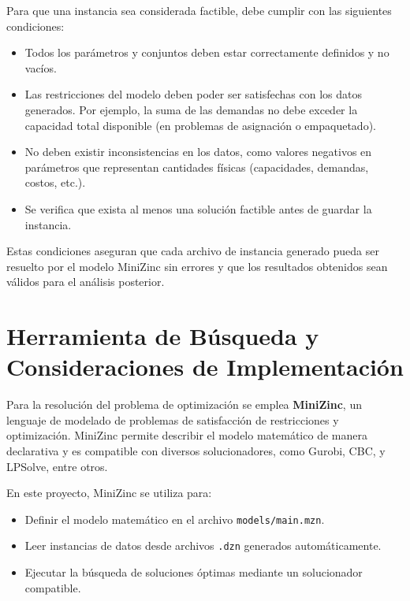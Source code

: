 \documentclass[a4paper,12pt]{article}
\begin{document}
Para que una instancia sea considerada factible, debe cumplir con las siguientes condiciones:
\begin{itemize}
    \item Todos los parámetros y conjuntos deben estar correctamente definidos y no vacíos.
    \item Las restricciones del modelo deben poder ser satisfechas con los datos generados. Por ejemplo, la suma de las demandas no debe exceder la capacidad total disponible (en problemas de asignación o empaquetado).
    \item No deben existir inconsistencias en los datos, como valores negativos en parámetros que representan cantidades físicas (capacidades, demandas, costos, etc.).
    \item Se verifica que exista al menos una solución factible antes de guardar la instancia.
\end{itemize}

Estas condiciones aseguran que cada archivo de instancia generado pueda ser resuelto por el modelo MiniZinc sin errores y que los resultados obtenidos sean válidos para el análisis posterior.

\section{Herramienta de Búsqueda y Consideraciones de Implementación}
Para la resolución del problema de optimización se emplea \textbf{MiniZinc}, un lenguaje de modelado de problemas de satisfacción de restricciones y optimización. MiniZinc permite describir el modelo matemático de manera declarativa y es compatible con diversos solucionadores, como Gurobi, CBC, y LPSolve, entre otros.

En este proyecto, MiniZinc se utiliza para:
\begin{itemize}
    \item Definir el modelo matemático en el archivo \texttt{models/main.mzn}.
    \item Leer instancias de datos desde archivos \texttt{.dzn} generados automáticamente.
    \item Ejecutar la búsqueda de soluciones óptimas mediante un solucionador compatible.
\end{itemize}
\end{document}
